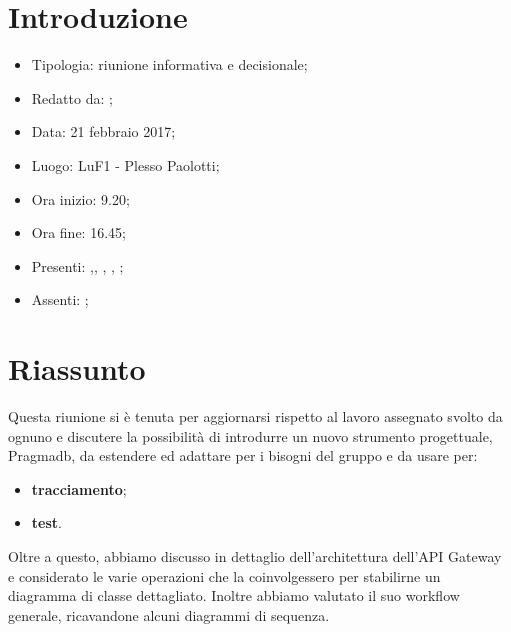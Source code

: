 \section{Introduzione}

	\begin{itemize}
		\item Tipologia: riunione informativa e decisionale;
		\item Redatto da: \DAN;
		\item Data: 21 febbraio 2017;
		\item Luogo: LuF1 - Plesso Paolotti;
		\item Ora inizio: 9.20;
		\item Ora fine: 16.45;
		\item Presenti: \AS,\AN, \DS, \MC, \NS;
		\item Assenti: \DAN;	
	\end{itemize}

\section{Riassunto}
Questa riunione si è tenuta per aggiornarsi rispetto al lavoro assegnato svolto da ognuno e discutere la possibilit\`{a} di introdurre un nuovo strumento progettuale, Pragmadb, da estendere ed adattare per i bisogni del gruppo e da usare per:
\begin{itemize}
	\item \textbf{tracciamento};
	\item \textbf{test}.
\end{itemize}

Oltre a questo, abbiamo discusso in dettaglio dell'architettura dell'API Gateway e considerato le varie operazioni che la coinvolgessero per stabilirne un diagramma di classe dettagliato. Inoltre abbiamo valutato il suo workflow generale, ricavandone alcuni diagrammi di sequenza. 


